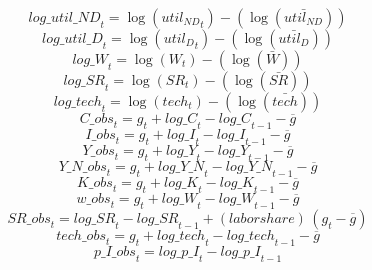 \begin{dmath}
{log\_util\_ND}_{t}=\log\left({{util_{ND}}}_{t}\right)-(\log\left(\bar{{util_{ND}}}\right))
\end{dmath}
\begin{dmath}
{log\_util\_D}_{t}=\log\left({{util_D}}_{t}\right)-(\log\left(\bar{{util_D}}\right))
\end{dmath}
\begin{dmath}
{log\_W}_{t}=\log\left({{W}}_{t}\right)-(\log\left(\bar{{W}}\right))
\end{dmath}
\begin{dmath}
{log\_SR}_{t}=\log\left({{SR}}_{t}\right)-(\log\left(\bar{{SR}}\right))
\end{dmath}
\begin{dmath}
{log\_tech}_{t}=\log\left({{tech}}_{t}\right)-(\log\left(\bar{{tech}}\right))
\end{dmath}
\begin{dmath}
{C\_obs}_{t}={{g}}_{t}+{log\_C}_{t}-{log\_C}_{t-1}-{{\overline{g}}}
\end{dmath}
\begin{dmath}
{I\_obs}_{t}={{g}}_{t}+{log\_I}_{t}-{log\_I}_{t-1}-{{\overline{g}}}
\end{dmath}
\begin{dmath}
{Y\_obs}_{t}={{g}}_{t}+{log\_Y}_{t}-{log\_Y}_{t-1}-{{\overline{g}}}
\end{dmath}
\begin{dmath}
{Y\_N\_obs}_{t}={{g}}_{t}+{log\_Y\_N}_{t}-{log\_Y\_N}_{t-1}-{{\overline{g}}}
\end{dmath}
\begin{dmath}
{K\_obs}_{t}={{g}}_{t}+{log\_K}_{t}-{log\_K}_{t-1}-{{\overline{g}}}
\end{dmath}
\begin{dmath}
{w\_obs}_{t}={{g}}_{t}+{log\_W}_{t}-{log\_W}_{t-1}-{{\overline{g}}}
\end{dmath}
\begin{dmath}
{SR\_obs}_{t}={log\_SR}_{t}-{log\_SR}_{t-1}+{(labor share)}\, \left({{g}}_{t}-{{\overline{g}}}\right)
\end{dmath}
\begin{dmath}
{tech\_obs}_{t}={{g}}_{t}+{log\_tech}_{t}-{log\_tech}_{t-1}-{{\overline{g}}}
\end{dmath}
\begin{dmath}
{p\_I\_obs}_{t}={log\_p\_I}_{t}-{log\_p\_I}_{t-1}
\end{dmath}
